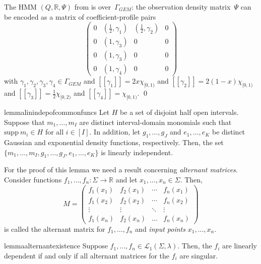 \documentclass[a4paper,UKenglish,cleveref, autoref,mathscr]{lipics-v2019}
\newcommand{\RR}{\mathbb{R}}
\newcommand{\1}{\mathbbm{1}}
\newcommand{\supp}{\mathrm{supp}}
\newcommand{\pl}{\Gamma_{\mathit{GEM}}}
\begin{document}
\begin{example}\label{profileexample}
The HMM $(Q, \RR, \Psi)$ from  is over~$\pl$: the observation density matrix~$\Psi$ can be encoded as a matrix of coefficient-profile pairs
\[
\begin{pmatrix}
0 & (\frac12, \gamma_1)  & (\frac12,\gamma_2) & 0 \\
0 & (1,\gamma_3) & 0 & 0 \\
0 & (1,\gamma_3) & 0 & 0 \\
0 & (1,\gamma_4) & 0 & 0
\end{pmatrix}
\]
with $\gamma_1, \gamma_2, \gamma_3, \gamma_4 \in \pl$ and
$[\![\gamma_1]\!] = 2x\chi_{[0,1)}$ and
$[\![\gamma_2]\!] = 2(1-x)\chi_{[0,1)}$ and
$[\![\gamma_3]\!] = \frac12 \chi_{[0,2)}$ and
$[\![\gamma_4]\!] = \chi_{[0,1)}$.
\qed
\end{example}

\begin{restatable}{lemma}{linindepofcommonfuncs}\label{linindepofcommonfuncs}
Let $H$ be a set of disjoint half open intervals.
Suppose that $m_1, \dots, m_I$ are distinct interval-domain monomials such that $\supp~m_i \in H$ for all $i \in [I]$. In addition, let $g_1, \dots, g_J$ and $e_1, \dots, e_K$ be distinct Gaussian and exponential density functions, respectively. Then, the set $\{m_1, \dots, m_I, g_1, \dots, g_J, e_1, \dots, e_K\}$ is linearly independent.
\end{restatable}

For the proof of this lemma we need a result concerning \emph{alternant matrices}. Consider functions $f_1, \dots, f_n : \Sigma \rightarrow \RR$ and let $x_1, \dots, x_n \in \Sigma$. Then,
\[M = \begin{pmatrix}
f_1(x_1) &  f_2(x_1) &  \cdots  & f_n(x_1) \\
f_1(x_2) & f_2(x_2) & \cdots  & f_n(x_2) \\
\vdots & \vdots & \ddots & \vdots \\
f_1(x_n) & f_2(x_n) & \dots  & f_n(x_n)
\end{pmatrix}\]
is called the alternant matrix for $f_1, \dots, f_n$ and \emph{input points} $x_1, \dots, x_n$.

\begin{restatable}{lemma}{alternantexistence}\label{alternantexistence}
Suppose $f_1, \dots, f_n \in \mathcal{L}_1(\Sigma, \lambda)$.
Then, the $f_i$ are linearly dependent if and only if all alternant matrices for the $f_i$ are singular.
\end{restatable}
\end{document}
